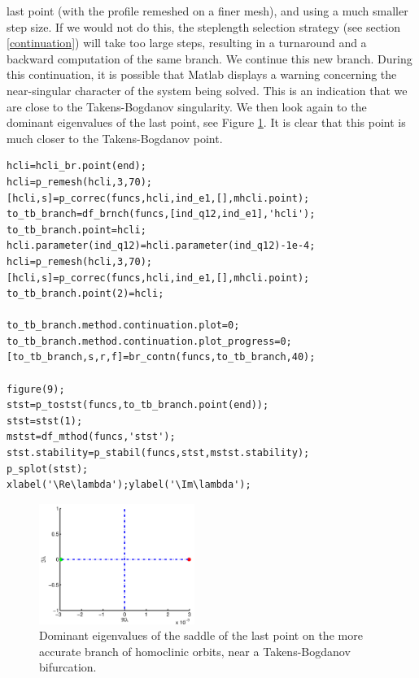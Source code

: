 \documentclass[10pt]{scrartcl}
\begin{document}
{last point (with the profile remeshed on a finer mesh), and using a
much smaller step size.  If we would not do this, the steplength
selection strategy (see section \ref{continuation}) will take too
large steps, resulting in a turnaround and a backward computation of
the same branch.  We continue this new branch.  During this
continuation, it is possible that Matlab displays a warning concerning
the near-singular character of the system being solved.  This is an
indication that we are close to the Takens-Bogdanov singularity.  We
then look again to the dominant eigenvalues of the last point, see
Figure \ref{demo3-9}.  It is clear that this point is much closer to
the Takens-Bogdanov point.  
\begin{lstlisting}
hcli=hcli_br.point(end);
hcli=p_remesh(hcli,3,70);
[hcli,s]=p_correc(funcs,hcli,ind_e1,[],mhcli.point);
to_tb_branch=df_brnch(funcs,[ind_q12,ind_e1],'hcli');
to_tb_branch.point=hcli;
hcli.parameter(ind_q12)=hcli.parameter(ind_q12)-1e-4;
hcli=p_remesh(hcli,3,70);
[hcli,s]=p_correc(funcs,hcli,ind_e1,[],mhcli.point);
to_tb_branch.point(2)=hcli;

to_tb_branch.method.continuation.plot=0;
to_tb_branch.method.continuation.plot_progress=0;
[to_tb_branch,s,r,f]=br_contn(funcs,to_tb_branch,40);

figure(9);
stst=p_tostst(funcs,to_tb_branch.point(end));
stst=stst(1);
mstst=df_mthod(funcs,'stst');
stst.stability=p_stabil(funcs,stst,mstst.stability);
p_splot(stst);
xlabel('\Re\lambda');ylabel('\Im\lambda');  
\end{lstlisting}

\begin{figure}
  \begin{center}
    \includegraphics[width=0.45\textwidth]{fig/hom_demfig09}
    \caption{Dominant eigenvalues of the saddle of the last point on the 
      more accurate branch
      of homoclinic orbits,
      near a Takens-Bogdanov bifurcation.\label{demo3-9}}
  \end{center}
\end{figure}

}
\end{document}
